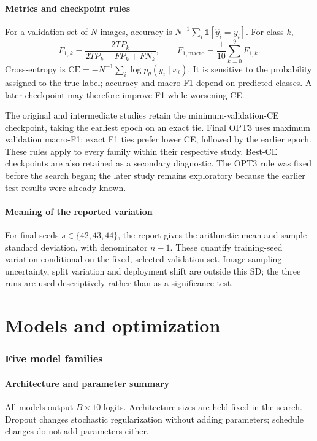 \subsection{Metrics and checkpoint rules}
For a validation set of $N$ images, accuracy is $N^{-1}\sum_i\mathbf{1}[\hat y_i=y_i]$. For class $k$,
\[
F_{1,k}=\frac{2TP_k}{2TP_k+FP_k+FN_k},\qquad
F_{1,\mathrm{macro}}=\frac{1}{10}\sum_{k=0}^{9}F_{1,k}.
\]
Cross-entropy is $\mathrm{CE}=-N^{-1}\sum_i\log p_\theta(y_i\mid x_i)$. It is sensitive to the probability assigned to the true label; accuracy and macro-F1 depend on predicted classes. A later checkpoint may therefore improve F1 while worsening CE.

The original and intermediate studies retain the minimum-validation-CE checkpoint, taking the earliest epoch on an exact tie. Final OPT3 uses maximum validation macro-F1; exact F1 ties prefer lower CE, followed by the earlier epoch. These rules apply to every family within their respective study. Best-CE checkpoints are also retained as a secondary diagnostic. The OPT3 rule was fixed before the search began; the later study remains exploratory because the earlier test results were already known.

\subsection{Meaning of the reported variation}
For final seeds $s\in\{42,43,44\}$, the report gives the arithmetic mean and sample standard deviation, with denominator $n-1$. These quantify training-seed variation conditional on the fixed, selected validation set. Image-sampling uncertainty, split variation and deployment shift are outside this SD; the three runs are used descriptively rather than as a significance test.

\clearpage
\part{Models and optimization}
\section{Five model families}
\subsection{Architecture and parameter summary}
All models output $B\times10$ logits. Architecture sizes are held fixed in the search. Dropout changes stochastic regularization without adding parameters; schedule changes do not add parameters either.

